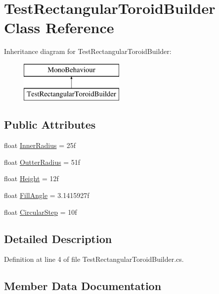 \hypertarget{class_test_rectangular_toroid_builder}{}\section{Test\+Rectangular\+Toroid\+Builder Class Reference}
\label{class_test_rectangular_toroid_builder}
Inheritance diagram for Test\+Rectangular\+Toroid\+Builder\+:\begin{figure}[H]
\begin{center}
\leavevmode
\includegraphics[height=2.000000cm]{class_test_rectangular_toroid_builder}
\end{center}
\end{figure}
\subsection*{Public Attributes}
\begin{DoxyCompactItemize}
\item 
float \mbox{\hyperlink{class_test_rectangular_toroid_builder_ad2d27a508825ab823e86a6ea3460a036}{Inner\+Radius}} = 25f
\item 
float \mbox{\hyperlink{class_test_rectangular_toroid_builder_aa8f9f63846378fa0a6b6e420e2391e88}{Outter\+Radius}} = 51f
\item 
float \mbox{\hyperlink{class_test_rectangular_toroid_builder_a9b5d6407a6daaa6bd9ec91acaf146065}{Height}} = 12f
\item 
float \mbox{\hyperlink{class_test_rectangular_toroid_builder_aedbb430ff20f22deb1d437fbfaa9cc4c}{Fill\+Angle}} = 3.\+1415927f
\item 
float \mbox{\hyperlink{class_test_rectangular_toroid_builder_afc270db54a2a85d8f98ea6d46a7afac2}{Circular\+Step}} = 10f
\end{DoxyCompactItemize}


\subsection{Detailed Description}


Definition at line 4 of file Test\+Rectangular\+Toroid\+Builder.\+cs.



\subsection{Member Data Documentation}
\mbox{\label{class_test_rectangular_toroid_builder_afc270db54a2a85d8f98ea6d46a7afac2}} 
